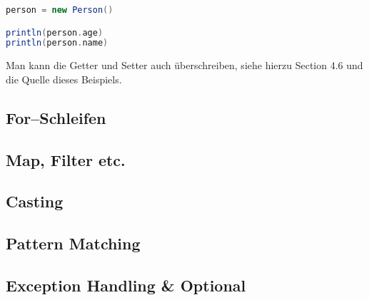\begin{lstlisting}[language=Scala]
person = new Person()

println(person.age)
println(person.name)
\end{lstlisting}

Man kann die Getter und Setter auch überschreiben, siehe hierzu \cite{ScalaCookbook} Section 4.6 und die Quelle dieses Beispiels.

\subsection{For--Schleifen}
\subsection{Map, Filter etc.}
\subsection{Casting}
\subsection{Pattern Matching}
\subsection{Exception Handling \& Optional}
